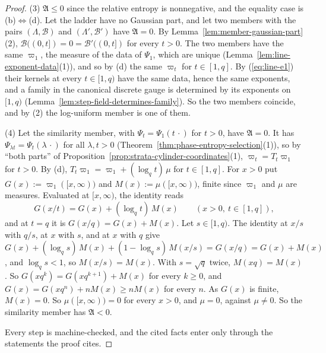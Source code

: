 \begin{proof}
(3) $\mathfrak{A} \le 0$ since the relative entropy is nonnegative, and the equality case is
(b)$\Leftrightarrow$(d). Let the ladder have no Gaussian part, and let two members with the pairs
$(\Lambda, \mathcal{B})$ and $(\Lambda', \mathcal{B}')$ have $\mathfrak{A} = 0$. By
Lemma~\ref{lem:member-gaussian-part}(2), $\mathcal{B}((0,t]) = 0 = \mathcal{B}'((0,t])$ for every
$t > 0$. The two members have the same $\varpi_1$, the measure of the data of $\Psi_1$, which are
unique (Lemma~\ref{lem:line-exponent-data}(1)), and so by (d) the same $\varpi_t$ for
$t \in [1,q]$. By (\ref{eq:line-e1}) their kernels at every $t \in [1,q)$ have the same data, hence the same
exponents, and a family in the canonical discrete gauge is determined by its exponents on $[1,q)$
(Lemma~\ref{lem:step-field-determines-family}). So the two members coincide, and by (2) the
log-uniform member is one of them.

(4) Let the similarity member, with $\Psi_t = \Psi_1(t\,\cdot)$ for $t > 0$, have
$\mathfrak{A} = 0$. It has $\Psi_{\lambda t} = \Psi_t(\lambda\,\cdot)$ for all $\lambda, t > 0$
(Theorem~\ref{thm:phase-entropy-selection}(1)), so by ``both parts'' of
Proposition~\ref{prop:strata-cylinder-coordinates}(1), $\varpi_t = T_t\varpi_1$ for $t > 0$. By (d),
$T_t\varpi_1 = \varpi_1 + (\log_qt)\,\mu$ for $t \in [1,q]$. For $x > 0$ put
$G(x) := \varpi_1([x,\infty))$ and $M(x) := \mu([x,\infty))$, finite since $\varpi_1$ and $\mu$ are
\Levy{} measures. Evaluated at $[x,\infty)$, the identity reads
\[
  G(x/t) = G(x) + (\log_qt)\,M(x) \qquad (x > 0,\ t \in [1,q]),
\]
and at $t = q$ it is $G(x/q) = G(x) + M(x)$. Let $s \in [1,q)$. The identity at $x/s$ with $q/s$, at
$x$ with $s$, and at $x$ with $q$ give
$G(x) + (\log_qs)\,M(x) + (1 - \log_qs)\,M(x/s) = G(x/q) = G(x) + M(x)$, and $\log_qs < 1$, so
$M(x/s) = M(x)$. With $s = \sqrt q$ twice, $M(xq) = M(x)$. So
$G(xq^k) = G(xq^{k+1}) + M(x)$ for every $k \ge 0$, and $G(x) = G(xq^n) + nM(x) \ge nM(x)$ for every
$n$. As $G(x)$ is finite, $M(x) = 0$. So $\mu([x,\infty)) = 0$ for every $x > 0$, and $\mu = 0$,
against $\mu \ne 0$. So the similarity member has $\mathfrak{A} < 0$.

Every step is machine-checked, and the cited facts enter only through the statements the proof
cites.
\end{proof}

